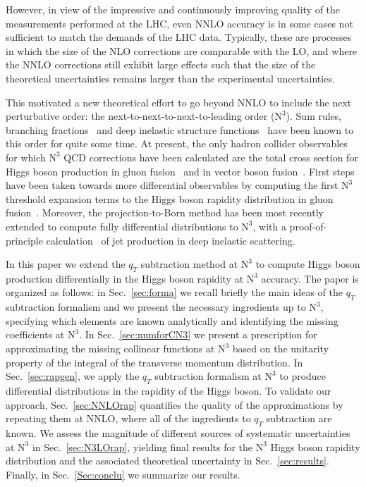 \documentclass[12pt]{article}
\DeclareRobustCommand{\qt}{\ensuremath{q_T}\xspace}
\DeclareRobustCommand{\LO}{\text{LO}\xspace}
\DeclareRobustCommand{\N}[1]{\ensuremath{\text{N}^{#1}}} %
\begin{document}
However, in view of the impressive and continuously improving quality of the measurements performed at the LHC, even NNLO accuracy is in some cases not sufficient to match the demands of the LHC data. Typically, these are processes in which the size of the NLO corrections are comparable with the LO, and where the NNLO corrections still exhibit large effects such that the size of the theoretical uncertainties remains larger than the experimental uncertainties. 

This motivated a new theoretical effort to go beyond NNLO to include the next perturbative order: the next-to-next-to-next-to-leading order (\N3\LO). Sum rules, branching fractions~\cite{Chetyrkin:1994js} and deep inelastic structure functions~\cite{Vermaseren:2005qc} have been known to this order for quite some time. At present, the only hadron collider observables for which \N3\LO QCD corrections have been calculated are the total cross section for Higgs boson  production in gluon fusion~\cite{Anastasiou:2015ema,Mistlberger:2018etf} and in vector boson 
fusion~\cite{Dreyer:2016oyx}. First steps have been taken towards more differential observables by computing the first \N3\LO threshold expansion terms to the Higgs boson rapidity distribution in gluon fusion~\cite{Dulat:2017prg}. Moreover, the projection-to-Born method has been most recently extended to compute fully differential distributions to \N3\LO, with a proof-of-principle calculation~\cite{Currie:2018fgr} of jet production in deep inelastic scattering. 

In this paper we extend the $\qt$ subtraction method at \N3\LO  to compute Higgs boson production differentially in the Higgs boson rapidity at \N3\LO accuracy. The paper is organized as follows: in Sec.~\ref{sec:forma} we recall briefly the main ideas of the $\qt$ subtraction formalism and we present the necessary ingredients up to  \N3\LO, specifying which elements are known analytically and identifying the missing coefficients at \N3\LO. In Sec.~\ref{sec:numforCN3} we present a prescription for approximating the missing collinear functions at \N3\LO based on the unitarity property of the integral of the transverse momentum distribution. In Sec.~\ref{sec:rapgen}, we apply the $\qt$ subtraction formalism at \N3\LO to produce differential distributions in the rapidity of the Higgs boson. To validate our approach, Sec.~\ref{sec:NNLOrap} quantifies the quality of the approximations by repeating them at NNLO, where all of the ingredients to $\qt$ subtraction are known. We assess the magnitude of different sources of systematic uncertainties at  \N3\LO in Sec.~\ref{sec:N3LOrap}, yielding final results for the \N3\LO Higgs boson rapidity distribution and the associated theoretical uncertainty in Sec.~\ref{sec:results}. Finally, in Sec.~\ref{Sec:conclu} we summarize our results.
\end{document}
